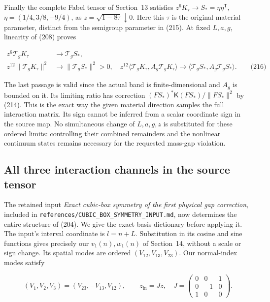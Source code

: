 Finally the complete Fabel tensor of Section~13 satisfies
\(z^6K_\tau\to S_*=\eta\eta^{\mathsf T}\), \(\eta=(1/4,3/8,-9/4)\), as
\(z=\sqrt{1-8\tau}\downarrow0\). Here this \(\tau\) is the original
material parameter, distinct from the semigroup parameter in (215). At
fixed \(L,a,g\), linearity of (208) proves

\[
\begin{aligned}
 z^6\mathcal T_gK_\tau&\longrightarrow\mathcal T_gS_*,\\
 z^{12}\|\mathcal T_gK_\tau\|^2&\longrightarrow\|\mathcal T_gS_*\|^2>0,
 \quad
 z^{12}\langle\mathcal T_gK_\tau,A_g\mathcal T_gK_\tau\rangle
       \longrightarrow\langle\mathcal T_gS_*,A_g\mathcal T_gS_*\rangle.
 \qquad\text{(216)}
\end{aligned}
\]

The last passage is valid since the actual band is finite-dimensional
and \(A_g\) is bounded on it. Its limiting ratio has correction
\((FS_*)^*\mathsf K(FS_*)/\|FS_*\|^2\) by (214). This is the exact way
the given material direction samples the full interaction matrix. Its
sign cannot be inferred from a scalar coordinate sign in the source map.
No simultaneous change of \(L,a,g,z\) is substituted for these ordered
limits: controlling their combined remainders and the nonlinear
continuum states remains necessary for the requested mass-gap violation.

\subsection{All three interaction channels in the source
tensor}\label{interacting-tensor-band-md-all-three-interaction-channels-in-the-source-tensor}

The retained input \emph{Exact cubic-box symmetry of the first physical
gap correction}, included in
\texttt{references/CUBIC\_BOX\_SYMMETRY\_INPUT.md}, now determines the
entire structure of (204). We give the exact basis dictionary before
applying it. The input's interval coordinate is \(l=n+L\). Substitution
in its cosine and sine functions gives precisely our \(v_1(n),w_1(n)\)
of Section~14, without a scale or sign change. Its spatial modes are
ordered \((V_{12},V_{13},V_{23})\). Our normal-index modes satisfy

\[
(V_1,V_2,V_3)=(V_{23},-V_{13},V_{12}),\qquad
 z_{\mathrm{in}}=Jz,\quad
 J=\begin{pmatrix}0&0&1\\0&-1&0\\1&0&0\end{pmatrix}.
\]

